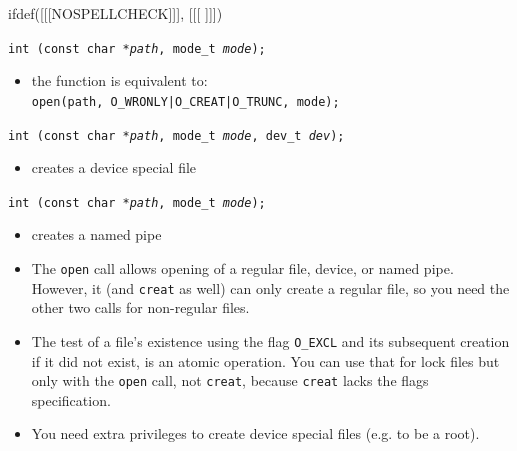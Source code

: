
ifdef([[[NOSPELLCHECK]]], [[[
]]])

\begin{slide}
\texttt{int (const char *\emph{path}, mode\_t \emph{mode});}
\begin{itemize}
\item the function is equivalent to:\\
\texttt{open(path, O\_WRONLY|O\_CREAT|O\_TRUNC, mode);}
\end{itemize}
\texttt{int (const char *\emph{path}, mode\_t \emph{mode},
dev\_t \emph{dev});}
\begin{itemize}
\item creates a device special file
\end{itemize}
\texttt{int (const char *\emph{path}, mode\_t \emph{mode});} 
\begin{itemize}
\item creates a named pipe
\end{itemize}
\end{slide}

\label{MKFIFO}
\label{CREAT}

\begin{itemize}
\item The \texttt{open} call allows opening of a regular file, device, or named
pipe.  However, it (and \texttt{creat} as well) can only create a regular file,
so you need the other two calls for non-regular files.
\item The test of a file's existence using the flag \texttt{O\_EXCL} and its
subsequent creation if it did not exist, is an atomic operation.  You can use
that for lock files but only with the \texttt{open} call, not \texttt{creat},
because \texttt{creat} lacks the flags specification.
\item You need extra privileges to create device special files (e.g. to be a
root).
\end{itemize}



